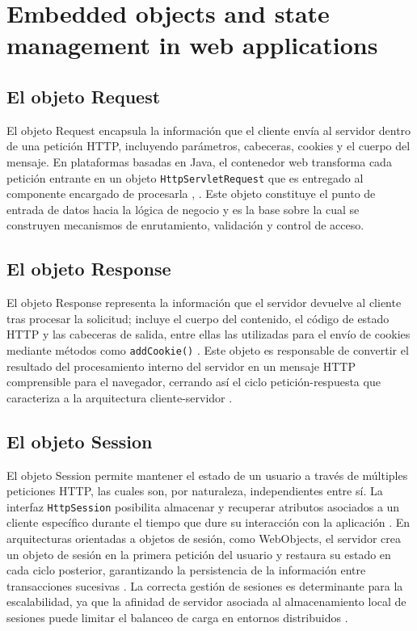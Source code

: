 \section{Embedded objects and state management in web applications}

\subsection{El objeto Request}

El objeto Request encapsula la información que el cliente envía al servidor dentro de una petición HTTP, incluyendo parámetros, cabeceras, cookies y el cuerpo del mensaje. En plataformas basadas en Java, el contenedor web transforma cada petición entrante en un objeto \texttt{HttpServletRequest} que es entregado al componente encargado de procesarla \cite{yang_asp}, \cite{gfg_servlet}. Este objeto constituye el punto de entrada de datos hacia la lógica de negocio y es la base sobre la cual se construyen mecanismos de enrutamiento, validación y control de acceso.

\subsection{El objeto Response}

El objeto Response representa la información que el servidor devuelve al cliente tras procesar la solicitud; incluye el cuerpo del contenido, el código de estado HTTP y las cabeceras de salida, entre ellas las utilizadas para el envío de cookies mediante métodos como \texttt{addCookie()} \cite{gfg_servlet}. Este objeto es responsable de convertir el resultado del procesamiento interno del servidor en un mensaje HTTP comprensible para el navegador, cerrando así el ciclo petición-respuesta que caracteriza a la arquitectura cliente-servidor \cite{yang_asp}.

\subsection{El objeto Session}

El objeto Session permite mantener el estado de un usuario a través de múltiples peticiones HTTP, las cuales son, por naturaleza, independientes entre sí. La interfaz \texttt{HttpSession} posibilita almacenar y recuperar atributos asociados a un cliente específico durante el tiempo que dure su interacción con la aplicación \cite{gfg_servlet}. En arquitecturas orientadas a objetos de sesión, como WebObjects, el servidor crea un objeto de sesión en la primera petición del usuario y restaura su estado en cada ciclo posterior, garantizando la persistencia de la información entre transacciones sucesivas \cite{apple_webobjects}. La correcta gestión de sesiones es determinante para la escalabilidad, ya que la afinidad de servidor asociada al almacenamiento local de sesiones puede limitar el balanceo de carga en entornos distribuidos \cite{guidance_share}.


